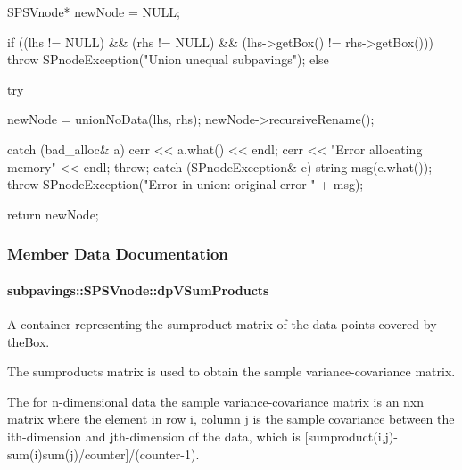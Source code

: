 \begin{DoxyCode}
    {
        SPSVnode* newNode = NULL;

        if ((lhs != NULL) && (rhs != NULL) && (lhs->getBox() != rhs->getBox()))
        {
            throw SPnodeException("Union unequal subpavings");
        }
        else {
            try {

                newNode = unionNoData(lhs, rhs);
                newNode->recursiveRename();
            }
            catch (bad_alloc& a) {
                cerr << a.what() << endl;
                cerr << "Error allocating memory" << endl;
                throw;
            }
            catch (SPnodeException& e) {
                string msg(e.what());
                throw SPnodeException("Error in union: original error " + msg);
            }
        }

        return newNode;

    }
\end{DoxyCode}


\subsubsection{\-Member \-Data \-Documentation}
\hypertarget{classsubpavings_1_1SPSVnode_af35e25f257c98de51097428419d0cf81}{
\paragraph[{dp\-V\-Sum\-Products}]{ {\bf subpavings\-::\-S\-P\-S\-Vnode\-::dp\-V\-Sum\-Products}}}\label{classsubpavings_1_1SPSVnode_af35e25f257c98de51097428419d0cf81}


\-A container representing the sumproduct matrix of the data points covered by the\-Box. 

\-The sumproducts matrix is used to obtain the sample variance-\/covariance matrix.

\-The for n-\/dimensional data the sample variance-\/covariance matrix is an nxn matrix where the element in row i, column j is the sample covariance between the ith-\/dimension and jth-\/dimension of the data, which is \mbox{[}sumproduct(i,j)-\/sum(i)sum(j)/counter\mbox{]}/(counter-\/1).

